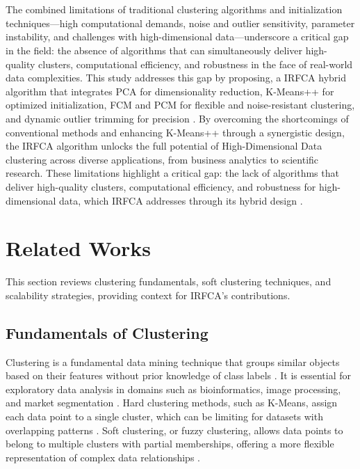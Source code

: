 \documentclass[twoside,11pt]{article}
\renewcommand{\cite}{\citep}
\begin{document}
\\\\
The combined limitations of traditional clustering algorithms and initialization techniques—high computational demands, noise and outlier sensitivity, parameter instability, and challenges with high-dimensional data—underscore a critical gap in the field: the absence of algorithms that can simultaneously deliver high-quality clusters, computational efficiency, and robustness in the face of real-world data complexities. This study addresses this gap by proposing, a IRFCA hybrid algorithm that integrates PCA for dimensionality reduction, K-Means++ for optimized initialization, FCM and PCM for flexible and noise-resistant clustering, and dynamic outlier trimming for precision \cite{elhaik2022}\cite{siddique2018}. By overcoming the shortcomings of conventional methods and enhancing K-Means++ through a synergistic design, the IRFCA algorithm unlocks the full potential of High-Dimensional Data clustering across diverse applications, from business analytics to scientific research. These limitations highlight a critical gap: the lack of algorithms that deliver high-quality clusters, computational efficiency, and robustness for high-dimensional data, which IRFCA addresses through its hybrid design \cite{ravuri2020}\cite{karras2023}\cite{li2024}.

\section{Related Works}
This section reviews clustering fundamentals, soft clustering techniques, and scalability strategies, providing context for IRFCA’s contributions.
\subsection{Fundamentals of Clustering}
Clustering is a fundamental data mining technique that groups similar objects based on their features without prior knowledge of class labels \cite{jain1999}. It is essential for exploratory data analysis in domains such as bioinformatics, image processing, and market segmentation \cite{xu2005}. Hard clustering methods, such as K-Means, assign each data point to a single cluster, which can be limiting for datasets with overlapping patterns \cite{wu2024}. Soft clustering, or fuzzy clustering, allows data points to belong to multiple clusters with partial memberships, offering a more flexible representation of complex data relationships \cite{raut2011}.
\end{document}
